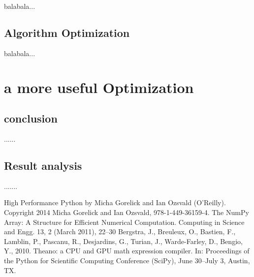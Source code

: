 \documentclass[12pt,a4paper]{article}
\begin{document}
balabala...

\subsection{Algorithm Optimization}

balabala...

\section{a more useful Optimization}

\subsection{conclusion}
......

\subsection{Result analysis}
.......
\newpage
\begin{thebibliography}{3}
	 High Performance Python by Micha Gorelick and Ian Ozsvald (O’Reilly). Copyright 2014 Micha Gorelick and Ian Ozsvald, 978-1-449-36159-4. 
	 The NumPy Array: A Structure for Efficient Numerical Computation. Computing in Science and Engg. 13, 2 (March 2011), 22–30
	 Bergstra, J., Breuleux, O., Bastien, F., Lamblin, P., Pascanu, R., Desjardins, G., Turian, J., Warde-Farley, D., Bengio, Y., 2010. Theano: a CPU and GPU math expression compiler. In: Proceedings of the Python for Scientific Computing Conference (SciPy), June 30–July 3, Austin, TX.
\end{thebibliography}
\end{document}
